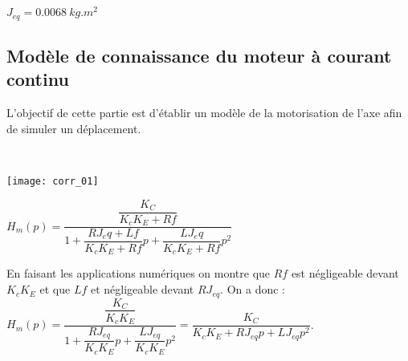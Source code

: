 \begin{multicols}{2}
\begin{corrige}
\end{corrige}
\else
\fi

\ifprof
\begin{corrige}
$J_{eq}=\SI{0,0068}{kg.m^2}$
\end{corrige}
\else
\fi

\subsection*{Modèle de connaissance du moteur à courant continu}

\begin{obj}
L'objectif de cette partie est d'établir un modèle de la motorisation de l'axe afin de simuler un déplacement.
\end{obj}

\ifprof
\begin{corrige} ~\\

\begin{center}
\texttt{[image: corr\_01]}
\end{center} 
\end{corrige}
\else
\fi
{}
\ifprof
\begin{corrige}
$H_m (p)=\dfrac{\dfrac{K_C}{K_c K_E+Rf}}{1+\dfrac{RJ_eq+Lf}{K_c K_E+Rf}p+\dfrac{LJ_eq}{K_c K_E+Rf} p^2}$
\end{corrige}
\else
\fi

\ifprof
\begin{corrige}
En faisant les applications numériques on montre que $Rf$ est négligeable devant $K_c K_E$ et que $Lf$ et négligeable devant $RJ_{eq}$. On a donc : 
$H_m (p)=\dfrac{\dfrac{K_C}{K_c K_E}}{1+\dfrac{RJ_{eq}}{K_c K_E }p+\dfrac{LJ_{eq}}{K_c K_E }p^2 }=\dfrac{K_C}{K_c K_E+RJ_{eq} p+LJ_{eq} p^2 }$.

\end{corrige}
\else
\fi


\end{multicols}

